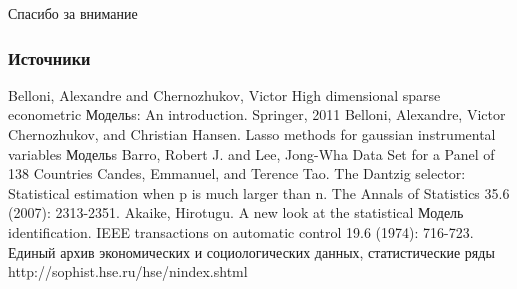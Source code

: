 \documentclass[c, dvipsnames]{beamer}  %
\begin{document}
\begin{frame}[c, plain]
\begin{center}

{\LARGE Спасибо за внимание}

\bigskip

{\Large \inserttitle}

\bigskip

{\insertauthor} 

\bigskip

\bigskip\bigskip

{\large \insertdate}
\end{center}
\end{frame}



\begin{frame}[c, plain]
  \frametitle{Источники}    
  \begin{thebibliography}{8}    
  \beamertemplatearticlebibitems
  {\small
    Belloni, Alexandre and Chernozhukov, Victor
    \newblock High dimensional sparse econometric Модельs: An introduction.
    \newblock Springer, 2011
   Belloni, Alexandre, Victor Chernozhukov, and Christian Hansen. 
   \newblock Lasso methods for gaussian instrumental variables Модельs
    Barro, Robert J.  and Lee, Jong-Wha 
    \newblock Data Set for a Panel of 138 Countries
     Candes, Emmanuel, and Terence Tao. 
    \newblock The Dantzig selector: Statistical estimation when p is much larger than n.
    \newblock The Annals of Statistics 35.6 (2007): 2313-2351.
     Akaike, Hirotugu.
    \newblock A new look at the statistical Модель identification.
    \newblock IEEE transactions on automatic control 19.6 (1974): 716-723.
    Единый архив экономических и социологических данных, статистические ряды
    \newblock http://sophist.hse.ru/hse/nindex.shtml
    \newblock 
    }
  \end{thebibliography}
\end{frame}
\end{document}
